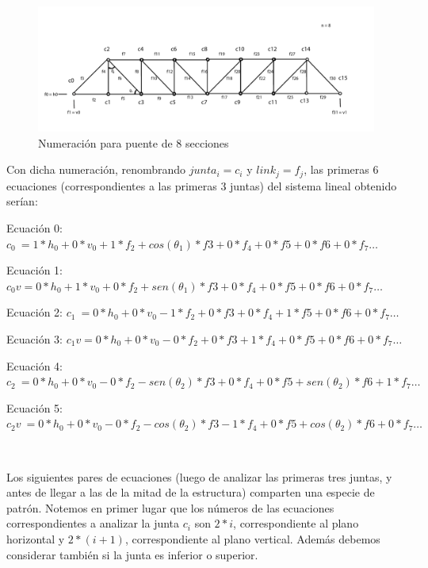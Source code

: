 \begin{figure}[!h]
	\begin{center}
		  \includegraphics[keepaspectratio]{Imagenes/im_1.pdf}
		  \caption{Numeración para puente de 8 secciones}
		  \label{fig:contra1}
	\end{center}
\end{figure}
\FloatBarrier

Con dicha numeración, renombrando $junta_{i}=c_{i}$ y $link_{j}=f_{j}$, las primeras 6 ecuaciones (correspondientes a las primeras 3 juntas) del sistema lineal obtenido serían:

Ecuación 0: $c_{0} \ = 1*h_{0} + 0*v_{0} + 1*f_{2} + cos(\theta_{1})*f3 + 0*f_{4} + 0*f{5} + 0*f{6} + 0*f_{7} \ldots$

Ecuación 1: $c_{0} v = 0* h_{0} + 1*v_{0} + 0*f_{2} + sen(\theta_{1})*f3 + 0*f_{4} + 0*f{5} + 0*f{6} + 0*f_{7} \ldots$

Ecuación 2: $c_{1} \ = 0* h_{0} + 0*v_{0} - 1*f_{2} + 0*f3 + 0*f_{4} + 1*f{5} + 0*f{6} + 0*f_{7} \ldots$

Ecuación 3: $c_{1} v = 0* h_{0} + 0*v_{0} - 0*f_{2} + 0*f3 + 1*f_{4} + 0*f{5} + 0*f{6} + 0*f_{7} \ldots$

Ecuación 4: $c_{2}  \ = 0* h_{0} + 0*v_{0} - 0*f_{2} - sen(\theta_{2})*f3 + 0*f_{4} + 0*f{5} + sen(\theta_{2})*f{6} + 1*f_{7} \ldots$

Ecuación 5: $c_{2}v  \ = 0* h_{0} + 0*v_{0} - 0*f_{2} - cos(\theta_{2})*f3 - 1*f_{4} + 0*f{5} + cos(\theta_{2})*f{6} + 0*f_{7} \ldots$

~

Los siguientes pares de ecuaciones (luego de analizar las primeras tres juntas, y antes de llegar a las de la mitad de la estructura) comparten una especie de patrón. Notemos en primer lugar que los números
de las ecuaciones correspondientes a analizar la junta $c_{i}$ son $2*i$, correspondiente al plano horizontal y $2*(i+1)$, correspondiente al plano vertical. Además debemos considerar también si la junta es 
inferior o superior.

